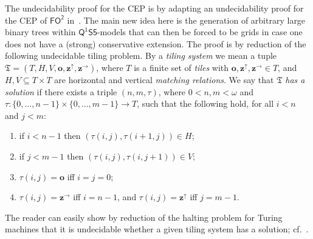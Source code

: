 \documentclass{lmcs} %
\theoremstyle{plain}\newtheorem{satz}[thm]{Satz} %
\newcommand{\nb}[1]{\textcolor{red}{\bf!}%
	\marginpar[\parbox{15mm}{\raggedleft\scriptsize\textcolor{red}{#1}}]%
	{\parbox{15mm}{\raggedright\scriptsize\textcolor{red}{#1}}}}
\newcommand{\tiling}{\mathfrak T}
\newcommand{\bbvarup}{\Zvar^\uparrow}
\newcommand{\bbvarright}{\Zvar^\to}
\newcommand{\FOT}{\ensuremath{\mathsf{FO^2}}}
\newcommand{\FOMS}{\ensuremath{\mathsf{Q^1S5}}}
\newcommand{\fform}[1]{\boldsymbol{#1}}
\newcommand{\ovar}{\fform{o}}
\newcommand{\Zvar}{\fform{z}}
\begin{document}
The undecidability proof for the CEP is by adapting an undecidability proof for the CEP of \FOT{} in~\cite{DBLP:conf/icalp/JungLM0W17}. The main new idea here is the generation of arbitrary large binary trees  within \FOMS{}-models that can then be forced to be grids in case one does not have a (strong) conservative extension. The proof is by reduction of the following undecidable tiling problem.	By a \emph{tiling system} we mean a tuple $\tiling=(T,H,V,\ovar,\bbvarup,\bbvarright)$, where
$T$ is a finite set of \emph{tiles} with 
$\ovar,\bbvarup,\bbvarright\in T$, and $H,V\subseteq T\times T$ are 	
horizontal and vertical \emph{matching relations\/}. 
We say that $\tiling$ \emph{has a solution} if there exists a triple
$(n,m,\tau)$, where $0<n,m < \omega$ and $\tau \colon \{0,\dots,n-1\}
\times \{0,\ldots,m-1\} \rightarrow T$, such that the following hold, for all 
$i< n$ and $j<m$:		
%
\begin{enumerate}[style=multiline,leftmargin=0.9cm]
	\item[\textbf{(t1)}] if $i<n-1$ then $(\tau(i,j),\tau(i+1,j)) \in H$;
	
	\item[\textbf{(t2)}] if $j<m-1$ then $(\tau(i,j),\tau(i,j+1)) \in V$;
	
	\item[\textbf{(t3)}] $\tau(i,j)=\ovar$ iff $i=j=0$;
	
	\item[\textbf{(t4)}] $\tau(i,j) = \bbvarright$ iff $i=n-1$, and $\tau(i,j) = \bbvarup$ iff $j=m-1$.
\end{enumerate}
%	
The reader can easily show by reduction of the halting problem for Turing machines that it is undecidable whether a given tiling system has a solution; cf.~\cite{EmdeBoas97}.
\end{document}
